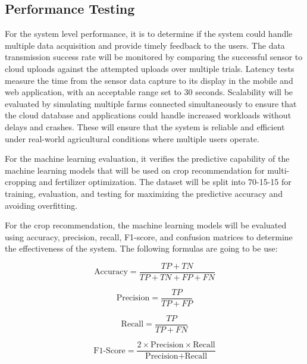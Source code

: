 {	\subsection{Performance Testing}
	For the system level performance, it is to determine if the system could handle multiple data acquisition and provide timely feedback to the users. The data transmission success rate will be monitored by comparing the successful sensor to cloud uploads against the attempted uploads over multiple trials. Latency tests measure the time from the sensor data capture to its display in the mobile and web application, with an acceptable range set to 30 seconds. Scalability will be evaluated by simulating multiple farms connected simultaneously to ensure that the cloud database and applications could handle increased workloads without delays and crashes. These will ensure that the system is reliable and efficient under real-world agricultural conditions where multiple users operate.
	
	For the machine learning evaluation, it verifies the predictive capability of the machine learning models that will be used on crop recommendation for multi-cropping and fertilizer optimization. The dataset will be split into 70-15-15 for training, evaluation, and testing for maximizing the predictive accuracy and avoiding overfitting. 
	
	For the crop recommendation, the machine learning models will be evaluated using accuracy, precision, recall, F1-score, and confusion matrices to determine the effectiveness of the system. The following formulas are going to be use:
	
	\begin{equation}
		\text{Accuracy} = \frac{TP + TN}{TP + TN + FP + FN}
		\label{eq:accuracy}
	\end{equation}
	
	\begin{equation}
		\text{Precision} = \frac{TP}{TP + FP}
		\label{eq:precision}
	\end{equation}
	
	\begin{equation}
		\text{Recall} = \frac{TP}{TP + FN}
		\label{eq:recall}
	\end{equation}
	
	\begin{equation}
		\text{F1-Score} = \frac{2 \times \text{Precision} \times \text{Recall}}{\text{Precision} + \text{Recall}}
		\label{eq:f1score}
	\end{equation}
	
}
